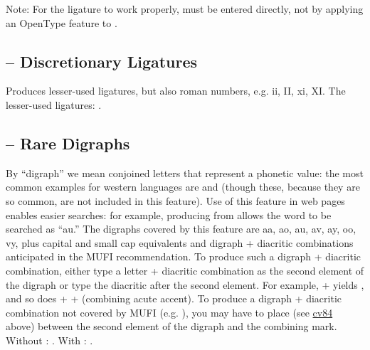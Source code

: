 \noindent{}
Note: For the ligature  to
work properly,   must be entered directly, not by applying an OpenType feature to
.

\subsection{ --
Discretionary Ligatures}
Produces lesser-used ligatures, but also roman numbers, e.g.
{ii, II, xi, XI}. The lesser-used ligatures:
.

\subsection{ -- Rare
Digraphs}\hypertarget{ss17}{}
By ``digraph'' we mean conjoined letters that represent a phonetic value: the most common examples
for western languages are \textex{{\ae}} and \textex{{\oe}} (though these, because they
are so common, are not included in this feature). Use of this feature in web pages enables easier searches: for
example, producing  from
 allows the word to be
searched as ``{\th}au.'' The digraphs covered by this feature are \textcolor[rgb]{0.5529412,0.15686275,0.11764706}{%
aa, ao, au, av, ay, oo, vy,} plus capital and small cap equivalents and digraph + diacritic combinations anticipated in the
MUFI recommendation. To produce such a digraph + diacritic combination, either type a letter + diacritic combination as
the second element of the digraph or type the diacritic after the second element. For example,
 +  yields , and so does
 +  +  (combining acute accent). To produce a digraph +
diacritic combination not covered by MUFI (e.g. ), you may have to place 
 (see \hyperlink{cv84}{cv84} above) between the second element of the digraph and the combining mark.
Without : .
With : .


